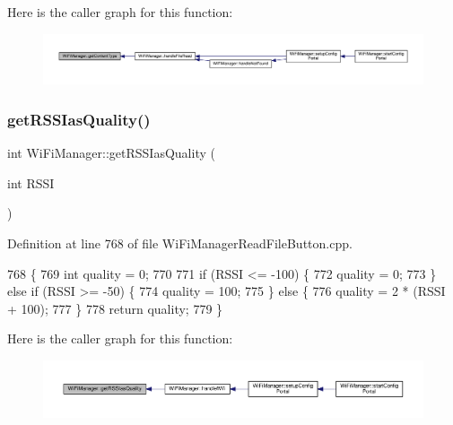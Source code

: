 Here is the caller graph for this function\+:\nopagebreak
\begin{figure}[H]
\begin{center}
\leavevmode
\includegraphics[width=350pt]{d4/dc8/class_wi_fi_manager_a40f123fd290c3e331c9785d19a88f3b8_icgraph}
\end{center}
\end{figure}
\mbox{\label{class_wi_fi_manager_ae71cfd6bd70ada2ca02e1d20b152d0e5}} 
\subsubsection{\texorpdfstring{get\+R\+S\+S\+Ias\+Quality()}{getRSSIasQuality()}}
{\footnotesize\ttfamily int Wi\+Fi\+Manager\+::get\+R\+S\+S\+Ias\+Quality (\begin{DoxyParamCaption}\item[{int}]{R\+S\+SI }\end{DoxyParamCaption})\hspace{0.3cm}{\ttfamily [private]}}



Definition at line 768 of file Wi\+Fi\+Manager\+Read\+File\+Button.\+cpp.


\begin{DoxyCode}
768                                           \{
769   \textcolor{keywordtype}{int} quality = 0;
770 
771   \textcolor{keywordflow}{if} (RSSI <= -100) \{
772     quality = 0;
773   \} \textcolor{keywordflow}{else} \textcolor{keywordflow}{if} (RSSI >= -50) \{
774     quality = 100;
775   \} \textcolor{keywordflow}{else} \{
776     quality = 2 * (RSSI + 100);
777   \}
778   \textcolor{keywordflow}{return} quality;
779 \}
\end{DoxyCode}
Here is the caller graph for this function\+:\nopagebreak
\begin{figure}[H]
\begin{center}
\leavevmode
\includegraphics[width=350pt]{d4/dc8/class_wi_fi_manager_ae71cfd6bd70ada2ca02e1d20b152d0e5_icgraph}
\end{center}
\end{figure}
\mbox{\label{class_wi_fi_manager_ac924dc071144e609afcf52073176c11f}} 
